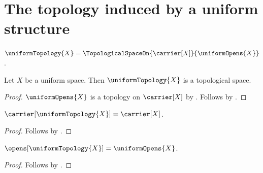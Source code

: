 


\section{The topology induced by a uniform structure}

\begin{definition}\label{uniform_topology}
    $\uniformTopology{X}=
        \TopologicalSpaceOn{\carrier[X]}{\uniformOpens{X}}$.
\end{definition}

\begin{theorem}\label{uniform_topology_is_topological_space}
    Let $X$ be a uniform space.
    Then $\uniformTopology{X}$ is a topological space.
\end{theorem}
\begin{proof}
    $\uniformOpens{X}$ is a topology on $\carrier[X]$
        by .
    Follows by
        .
\end{proof}

\begin{proposition}\label{uniform_topology_carrier}
    $\carrier[\uniformTopology{X}]=\carrier[X]$.
\end{proposition}
\begin{proof}
    Follows by
        .
\end{proof}

\begin{proposition}\label{uniform_topology_opens}
    $\opens[\uniformTopology{X}]=\uniformOpens{X}$.
\end{proposition}
\begin{proof}
    Follows by
        .
\end{proof}

